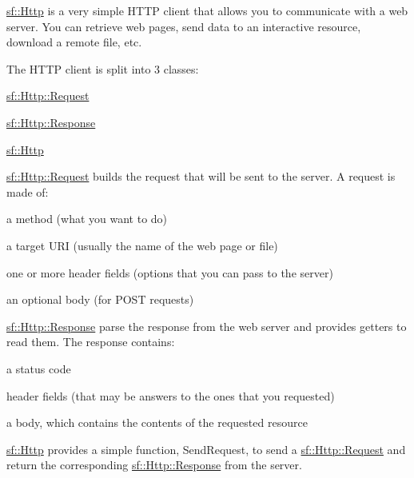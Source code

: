 \hyperlink{classsf_1_1_http}{sf\-::\-Http} is a very simple H\-T\-T\-P client that allows you to communicate with a web server. You can retrieve web pages, send data to an interactive resource, download a remote file, etc.

The H\-T\-T\-P client is split into 3 classes\-: \begin{DoxyItemize}
\item \hyperlink{classsf_1_1_http_1_1_request}{sf\-::\-Http\-::\-Request} \item \hyperlink{classsf_1_1_http_1_1_response}{sf\-::\-Http\-::\-Response} \item \hyperlink{classsf_1_1_http}{sf\-::\-Http}\end{DoxyItemize}
\hyperlink{classsf_1_1_http_1_1_request}{sf\-::\-Http\-::\-Request} builds the request that will be sent to the server. A request is made of\-: \begin{DoxyItemize}
\item a method (what you want to do) \item a target U\-R\-I (usually the name of the web page or file) \item one or more header fields (options that you can pass to the server) \item an optional body (for P\-O\-S\-T requests)\end{DoxyItemize}
\hyperlink{classsf_1_1_http_1_1_response}{sf\-::\-Http\-::\-Response} parse the response from the web server and provides getters to read them. The response contains\-: \begin{DoxyItemize}
\item a status code \item header fields (that may be answers to the ones that you requested) \item a body, which contains the contents of the requested resource\end{DoxyItemize}
\hyperlink{classsf_1_1_http}{sf\-::\-Http} provides a simple function, Send\-Request, to send a \hyperlink{classsf_1_1_http_1_1_request}{sf\-::\-Http\-::\-Request} and return the corresponding \hyperlink{classsf_1_1_http_1_1_response}{sf\-::\-Http\-::\-Response} from the server.

